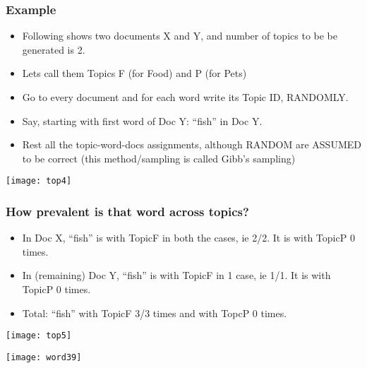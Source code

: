 \begin{frame}[fragile]\frametitle{Example}
  \begin{itemize}
	\item Following shows two documents X and Y, and number of topics to be be generated is 2.
	\item Lets call them Topics F (for Food) and P (for Pets)
	\item Go to every document and for each word write its Topic ID, RANDOMLY.
\item Say, starting with first word of Doc Y: ``fish'' in Doc Y.
\item Rest all the topic-word-docs assignments, although RANDOM are ASSUMED to be correct (this method/sampling is called Gibb's sampling)
  \end{itemize}
\begin{center}
\texttt{[image: top4]}
\end{center}

\end{frame}

\begin{frame}[fragile]\frametitle{How prevalent is that word across topics? }
  \begin{itemize}
	\item In Doc X, ``fish'' is with TopicF in both the cases, ie 2/2. It is with TopicP 0 times.
	\item In (remaining) Doc Y, ``fish'' is with TopicF in 1 case, ie 1/1. It is with TopicP 0 times.
	\item Total: ``fish'' with TopicF 3/3 times and with TopcP 0 times.
  \end{itemize}
  
\begin{center}
\texttt{[image: top5]}

\texttt{[image: word39]}
\end{center}
\end{frame}




